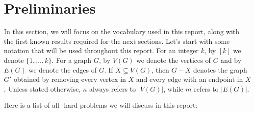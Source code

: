 \section{Preliminaries}
\label{section:preliminaries}

In this section, we will focus on the vocabulary used in this report, along with the first known results required for the next sections. Let's start with some notation that will be used throughout this report. For an integer $k$, by $[k]$ we denote $\{1, \dots, k\}$. For a graph $G$, by $V(G)$ we denote the vertices of $G$ and by $E(G)$ we denote the edges of $G$. If $X \subseteq V(G)$, then $G - X$ denotes the graph $G'$ obtained by removing every vertex in $X$ and every edge with an endpoint in $X$. Unless stated otherwise, $n$ always refers to $|V(G)|$, while $m$ refers to $|E(G)|$. 

\medskip

Here is a list of all \NP-hard problems we will discuss in this report:

\begin{problem}
\end{problem}

\begin{problem}
\end{problem}

\begin{problem}
\end{problem}


